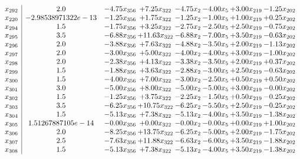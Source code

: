 \documentclass[8pt]{article}
\begin{document}
\[\begin{array}{c| c c@{\hskip 2pt} c@{\hskip 2pt} c@{\hskip 2pt} c@{\hskip 2pt} c@{\hskip 2pt} c@{\hskip 2pt} }
 x_{292}   &  2.0 & -4.75 x_{356} & +  7.25 x_{322} & -4.75 x_{2} & -4.00 x_{5} & +  3.00 x_{219} & -1.25 x_{202}\\
 x_{220}   &  -2.98538971322e-13 & -1.25 x_{356} & +  1.75 x_{322} & -1.25 x_{2} & -1.00 x_{5} & +  1.00 x_{219} & +  0.25 x_{202}\\
 x_{294}   &  1.5 & -1.75 x_{356} & +  3.25 x_{322} & -2.75 x_{2} & -2.50 x_{5} & +  2.50 x_{219} & -0.75 x_{202}\\
 x_{295}   &  3.5 & -6.88 x_{356} & + 11.63 x_{322} & -6.88 x_{2} & -7.00 x_{5} & +  3.50 x_{219} & -0.63 x_{202}\\
 x_{296}   &  2.0 & -3.88 x_{356} & +  7.63 x_{322} & -4.88 x_{2} & -3.50 x_{5} & +  2.00 x_{219} & -1.13 x_{202}\\
 x_{297}   &  2.0 & -3.00 x_{356} & +  5.00 x_{322} & -4.00 x_{2} & -4.00 x_{5} & +  3.00 x_{219} & -1.00 x_{202}\\
 x_{298}   &  2.0 & -2.38 x_{356} & +  4.13 x_{322} & -3.38 x_{2} & -3.50 x_{5} & +  2.00 x_{219} & +  0.37 x_{202}\\
 x_{299}   &  1.5 & -1.88 x_{356} & +  3.63 x_{322} & -2.88 x_{2} & -3.00 x_{5} & +  2.50 x_{219} & -0.63 x_{202}\\
 x_{300}   &  1.5 & -4.00 x_{356} & +  7.00 x_{322} & -3.00 x_{2} & -2.50 x_{5} & +  0.50 x_{219} & +  0.50 x_{202}\\
 x_{301}   &  3.0 & -5.00 x_{356} & +  8.00 x_{322} & -5.00 x_{2} & -5.00 x_{5} & +  3.00 x_{219} & -0.00 x_{202}\\
 x_{302}   &  1.5 & -1.25 x_{356} & +  3.75 x_{322} & -2.25 x_{2} & -1.50 x_{5} & +  0.50 x_{219} & -0.25 x_{202}\\
 x_{303}   &  3.5 & -6.25 x_{356} & + 10.75 x_{322} & -6.25 x_{2} & -5.50 x_{5} & +  2.50 x_{219} & -0.25 x_{202}\\
 x_{304}   &  1.5 & -5.13 x_{356} & +  7.38 x_{322} & -5.13 x_{2} & -4.00 x_{5} & +  3.50 x_{219} & -1.38 x_{202}\\
 x_{305}   &  1.51267887105e-14 & -0.00 x_{356} & +  0.00 x_{322} & -0.00 x_{2} & -0.00 x_{5} & +  0.00 x_{219} & +  1.00 x_{202}\\
 x_{306}   &  2.0 & -8.25 x_{356} & + 13.75 x_{322} & -6.25 x_{2} & -5.00 x_{5} & +  2.00 x_{219} & -1.75 x_{202}\\
 x_{307}   &  2.5 & -7.63 x_{356} & + 11.88 x_{322} & -6.63 x_{2} & -6.00 x_{5} & +  3.50 x_{219} & -1.88 x_{202}\\
 x_{308}   &  1.5 & -5.13 x_{356} & +  7.38 x_{322} & -5.13 x_{2} & -4.00 x_{5} & +  3.50 x_{219} & -1.38 x_{202}\\

\end{array}\]
\end{document}
